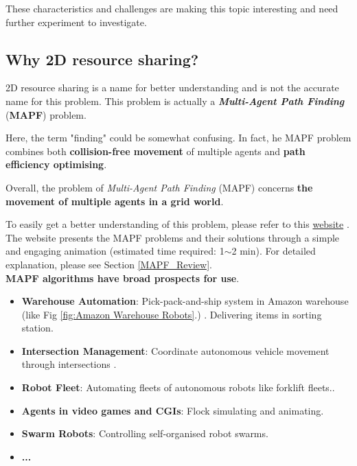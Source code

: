 \documentclass[12pt, oneside]{article}
\begin{document}
These characteristics and challenges are making this topic interesting and need further experiment to investigate.

\subsection{Why 2D resource sharing?}

    2D resource sharing is a name for better understanding and is not the accurate name for this problem. This problem is actually a \textbf{\textit{Multi-Agent Path Finding}} (\textbf{MAPF})\cite{MAPF_Deadlock_Explain2} problem. 
    
    Here, the term "finding" could be somewhat confusing. In fact, he MAPF problem combines both \textbf{collision-free movement} of multiple agents and \textbf{path efficiency optimising}.

    Overall, the problem of \textit{Multi-Agent Path Finding} (MAPF) concerns \textbf{the movement of multiple agents in a grid world}.
    
    To easily get a better understanding of this problem, please refer to this \href{https://primalgrid.netlify.app/primal}{website} \footnotemark. The website presents the MAPF problems and their solutions through a simple and engaging animation (estimated time required: 1$\sim$2 min). For detailed explanation, please see Section \ref{MAPF_Review}.
    \\[8pt]
    \textbf{MAPF algorithms have broad prospects for use}.
    \begin{itemize}
        \item \textbf{Warehouse Automation}: Pick-pack-and-ship system in Amazon warehouse (like Fig \ref{fig:Amazon Warehouse Robots}.) \cite{Amazon_Kiva}. Delivering items in sorting station\cite{Warehouse_Automation1,Warehouse_Automation2}.
        \item \textbf{Intersection Management}: Coordinate autonomous vehicle movement through intersections \cite{Intersection_Management}.
        \item \textbf{Robot Fleet}: Automating fleets of autonomous robots like forklift fleets.\cite{Fork_Fleet1,Fork_Fleet2}.  
        \item \textbf{Agents in video games and CGIs}: Flock simulating and animating\cite{Flocking_1,Flocking_2}.
        \item \textbf{Swarm Robots}: Controlling self-organised robot swarms\cite{Swarm_Robotics}.
        \item \textbf{...}
    \end{itemize}
\end{document}
